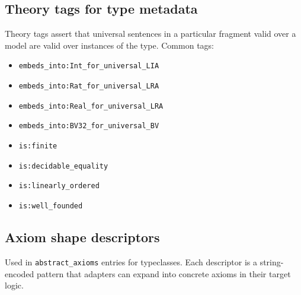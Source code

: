\documentclass[11pt,letterpaper]{article}
\theoremstyle{definition}
\theoremstyle{remark}
\begin{document}
\subsection{Theory tags for type metadata}
\label{app:theory-tags}

Theory tags assert that universal sentences in a particular fragment
valid over a model are valid over instances of the type. Common tags:

\begin{itemize}[leftmargin=2em]
  \item \texttt{embeds\_into:Int\_for\_universal\_LIA}
  \item \texttt{embeds\_into:Rat\_for\_universal\_LRA}
  \item \texttt{embeds\_into:Real\_for\_universal\_LRA}
  \item \texttt{embeds\_into:BV32\_for\_universal\_BV}
  \item \texttt{is:finite}
  \item \texttt{is:decidable\_equality}
  \item \texttt{is:linearly\_ordered}
  \item \texttt{is:well\_founded}
\end{itemize}

\subsection{Axiom shape descriptors}
\label{app:axiom-shapes}

Used in \texttt{abstract\_axioms} entries for typeclasses. Each
descriptor is a string-encoded pattern that adapters can
expand into concrete axioms in their target logic.
\end{document}

